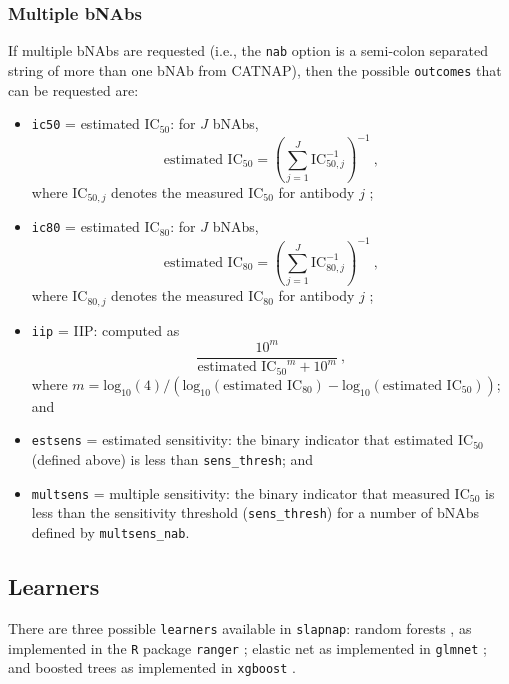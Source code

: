 \documentclass[]{article}
\providecommand{\tightlist}{%
  \setlength{\itemsep}{0pt}\setlength{\parskip}{0pt}}
\begin{document}
\subsubsection{Multiple bNAbs}\label{multiple-bnabs}

If multiple bNAbs are requested (i.e., the \texttt{nab} option is a
semi-colon separated string of more than one bNAb from CATNAP), then the
possible \texttt{outcomes} that can be requested are:

\begin{itemize}
\tightlist
\item
  \texttt{ic50} = estimated IC\(_{50}\): for \(J\) bNAbs,
  \[ \mbox{estimated IC}_{50} = \left( \sum_{j=1}^J \mbox{IC}_{50,j}^{-1} \right)^{-1} \ , \]
  where IC\(_{50,j}\) denotes the measured IC\(_{50}\) for antibody
  \(j\) \citep{wagh2016optimal};
\item
  \texttt{ic80} = estimated IC\(_{80}\): for \(J\) bNAbs,
  \[ \mbox{estimated IC}_{80} = \left( \sum_{j=1}^J \mbox{IC}_{80,j}^{-1} \right)^{-1} \ , \]
  where IC\(_{80,j}\) denotes the measured IC\(_{80}\) for antibody
  \(j\) \citep{wagh2016optimal};
\item
  \texttt{iip} = IIP: computed as
  \[ \frac{10^m}{\mbox{estimated IC$_{50}$}^m + 10^m} \ , \] where
  \(m = \mbox{log}_{10}(4) / (\mbox{log}_{10}(\mbox{estimated IC}_{80}) - \mbox{log}_{10}(\mbox{estimated IC}_{50}))\);
  and
\item
  \texttt{estsens} = estimated sensitivity: the binary indicator that
  estimated IC\(_{50}\) (defined above) is less than
  \texttt{sens\_thresh}; and
\item
  \texttt{multsens} = multiple sensitivity: the binary indicator that
  measured IC\(_{50}\) is less than the sensitivity threshold
  (\texttt{sens\_thresh}) for a number of bNAbs defined by
  \texttt{multsens\_nab}.
\end{itemize}

\subsection{Learners}\label{sec:learnerdetails}

There are three possible \texttt{learners} available in
\texttt{slapnap}: random forests \citep{breiman2001}, as implemented in
the \texttt{R} package \texttt{ranger} \citep{rangerpkg}; elastic net
\citep{zou2005} as implemented in \texttt{glmnet} \citep{glmnetpkg}; and
boosted trees \citep{friedman2001, chen2016} as implemented in
\texttt{xgboost} \citep{xgboostpkg}.
\end{document}
